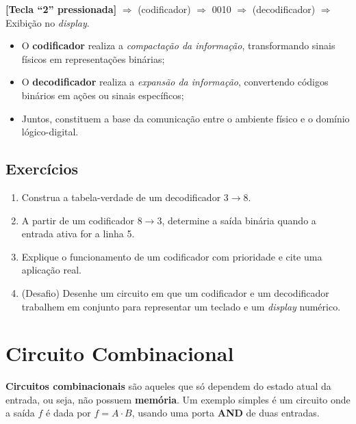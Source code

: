 \documentclass[12pt]{article}
\begin{document}
\begin{center}
\textbf{[Tecla “2” pressionada]} $\Rightarrow$ (codificador) $\Rightarrow$ 0010 $\Rightarrow$ (decodificador) $\Rightarrow$ Exibição no \textit{display}.
\end{center}

\begin{tcolorbox}[mynote, title=\textbf{Resumo conceitual}]
\begin{itemize}
    \item O \textbf{codificador} realiza a \textit{compactação da informação}, transformando sinais físicos em representações binárias;
    \item O \textbf{decodificador} realiza a \textit{expansão da informação}, convertendo códigos binários em ações ou sinais específicos;
    \item Juntos, constituem a base da comunicação entre o ambiente físico e o domínio lógico-digital.
\end{itemize}
\end{tcolorbox}

\subsection{Exercícios}

\begin{enumerate}
    \item Construa a tabela-verdade de um decodificador \(3 \rightarrow 8\).
    \item A partir de um codificador \(8 \rightarrow 3\), determine a saída binária quando a entrada ativa for a linha 5.
    \item Explique o funcionamento de um codificador com prioridade e cite uma aplicação real.
    \item (Desafio) Desenhe um circuito em que um codificador e um decodificador trabalhem em conjunto para representar um teclado e um \textit{display} numérico.
\end{enumerate}

\section{Circuito Combinacional}

\textbf{Circuitos combinacionais} são aqueles que só dependem do estado atual da entrada, ou seja, não possuem \textbf{memória}.
Um exemplo simples é um circuito onde a saída $f$ é dada por $f = A \cdot B$, usando uma porta \textbf{AND} de duas entradas.
\end{document}
